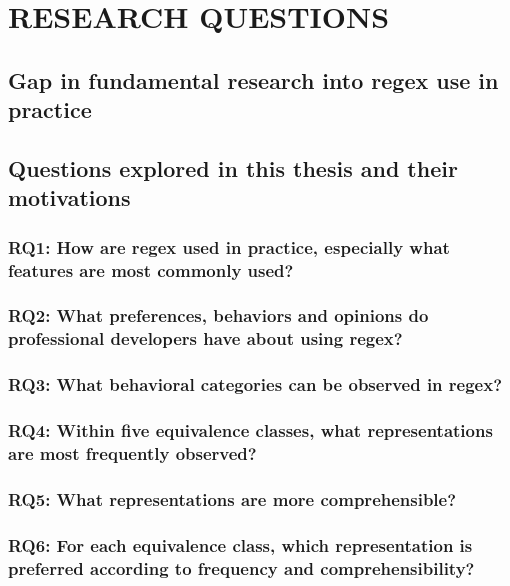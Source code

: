 \chapter{RESEARCH QUESTIONS}

\section{Gap in fundamental research into regex use in practice}

\section{Questions explored in this thesis and their motivations}

\subsection{RQ1: How are regex used in practice, especially what features are most commonly used?}

\subsection{RQ2: What preferences, behaviors and opinions do professional developers have about using regex?}

\subsection{RQ3: What behavioral categories can be observed in regex?}

\subsection{RQ4: Within five equivalence classes, what representations are most frequently observed?}

\subsection{RQ5: What representations are more comprehensible?}

\subsection{RQ6: For each equivalence class, which representation is preferred according to frequency and comprehensibility?}
